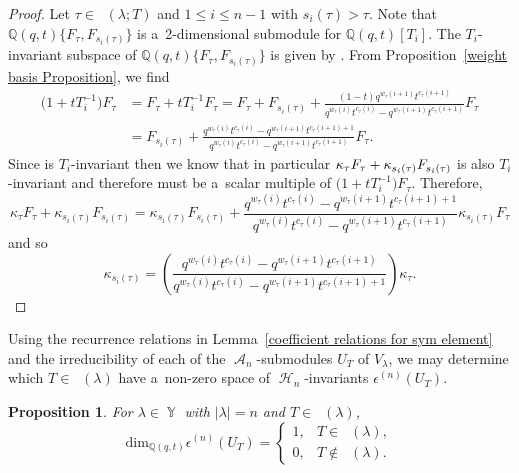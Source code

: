 \documentclass[pdftex]{sigma}
\numberwithin{equation}{section}
\newtheorem{Proposition}[Theorem]{Proposition}
\theoremstyle{definition}
\DeclareMathOperator{\Par}{\mathbb{Y}}
\DeclareMathOperator{\RYT}{\mathrm{RYT}_{\geq 0}}
\DeclareMathOperator{\PSYT}{\mathrm{PSYT}_{\geq 0}}
\DeclareMathOperator{\RSSYT}{\mathrm{RSSYT}_{\geq 0}}
\DeclareMathOperator{\sH}{\mathscr{H}}
\DeclareMathOperator{\sA}{\mathscr{A}}
\begin{document}
\begin{proof}
 Let $\tau \in \PSYT(\lambda;T)$ and $1 \leq i \leq n-1$ with $s_i(\tau) > \tau$. Note that $\mathbb{Q}(q,t)\{F_{\tau}, F_{s_i(\tau)}\}$ is a~2-dimensional submodule for $\mathbb{Q}(q,t)[T_i]$. The $T_i$-invariant subspace of $\mathbb{Q}(q,t)\{F_{\tau}, F_{s_i(\tau)}\}$ is given by . From Proposition~\ref{weight basis Proposition}, we find
 \begin{align*}
 \bigl(1+tT_{i}^{-1}\bigr)F_{\tau}& = F_{\tau} + tT_i^{-1}F_{\tau}
 = F_{\tau} + F_{s_i(\tau)} + \frac{(1-t)q^{w_{\tau}(i+1)}t^{c_{\tau}(i+1)}}{q^{w_{\tau}(i)}t^{c_{\tau}(i)}-q^{w_{\tau}(i+1)}t^{c_{\tau}(i+1)}} F_{\tau} \\
 & = F_{s_i(\tau)} + \frac{q^{w_{\tau}(i)}t^{c_{\tau}(i)}-q^{w_{\tau}(i+1)}t^{c_{\tau}(i+1)+1}}{q^{w_{\tau}(i)}t^{c_{\tau}(i)}-q^{w_{\tau}(i+1)}t^{c_{\tau}(i+1)}}F_{\tau}.
 \end{align*}
 Since \smash{$v = \sum_{\tau \in \PSYT(\lambda;T)} \kappa_{\tau}F_{\tau}$} is $T_i$-invariant then we know that in particular
 $\kappa_{\tau}F_{\tau}\allowbreak + \smash{\kappa_{s_i(\tau)}F_{s_i(\tau)}}$ is also $T_i$-invariant and therefore must be a~scalar multiple of $\bigl(1+tT_i^{-1}\bigr)F_{\tau}$. Therefore,
 \[
 \kappa_{\tau}F_{\tau} + \kappa_{s_i(\tau)}F_{s_i(\tau)} = \kappa_{s_i(\tau)}F_{s_i(\tau)} + \frac{q^{w_{\tau}(i)}t^{c_{\tau}(i)}-q^{w_{\tau}(i+1)}t^{c_{\tau}(i+1)+1}}{q^{w_{\tau}(i)}t^{c_{\tau}(i)}-q^{w_{\tau}(i+1)}t^{c_{\tau}(i+1)}}\kappa_{s_i(\tau)}F_{\tau}
 \]
 and so
 \[
 \kappa_{s_i(\tau)} = \left( \frac{q^{w_{\tau}(i)}t^{c_{\tau}(i)} - q^{w_{\tau}(i+1)}t^{c_{\tau}(i+1)}}{q^{w_{\tau}(i)}t^{c_{\tau}(i)} - q^{w_{\tau}(i+1)}t^{c_{\tau}(i+1)+1}} \right) \kappa_{\tau}.\tag*{\qed}
 \]\renewcommand{\qed}{}
\end{proof}

Using the recurrence relations in Lemma~\ref{coefficient relations for sym element} and the irreducibility of each of the $\sA_n$-sub\-modules $U_{T}$ of $V_{\lambda}$, we may determine which $T \in \RYT(\lambda)$ have a~non-zero space of $\sH_n$\nobreakdash-invariants $\epsilon^{(n)}(U_T)$.

\begin{Proposition}\label{sym AHA submodules}
 For $\lambda \in \Par$ with $|\lambda| = n$ and $T \in \RYT(\lambda)$,
 \[
 \mathrm{dim}_{\mathbb{Q}(q,t)} \epsilon^{(n)}(U_T) =\begin{cases}
 1 ,& T \in \RSSYT(\lambda),\\
 0, & T \notin \RSSYT(\lambda).
 \end{cases}
 \]

 \end{Proposition}
\end{document}

